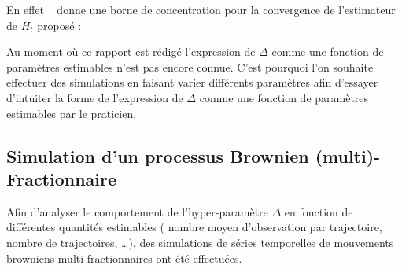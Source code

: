 En effet ~\cite[Thm 1]{maissoro-SmoothnessFTSweakDep} donne une borne de concentration pour la convergence de l'estimateur de $H_t$ proposé :


Au moment où ce rapport est rédigé l'expression de $\Delta$ comme une fonction de paramètres estimables n'est pas encore connue. C'est pourquoi l'on souhaite effectuer des simulations en faisant varier différents paramètres afin d'essayer d'intuiter la forme de l'expression de $\Delta$ comme une fonction de paramètres estimables par le praticien.

\citationrequise

\subsection{Simulation d'un processus Brownien (multi)-Fractionnaire}

Afin d'analyser le comportement de l'hyper-paramètre $\Delta$ en fonction de différentes quantités estimables ( nombre moyen d'observation par trajectoire, nombre de trajectoires, \dots ), des simulations de séries temporelles de mouvements browniens multi-fractionnaires ont été effectuées. 





